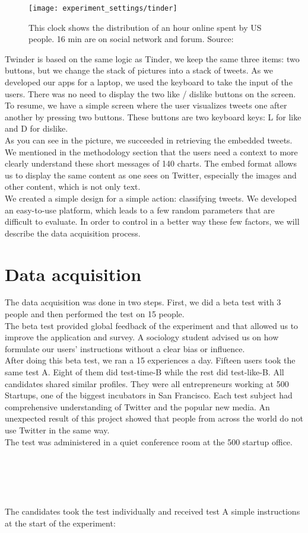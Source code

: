 \begin{figure}[h] 
\centering 
\texttt{[image: experiment\_settings/tinder]} 
\caption[Time spent of Social Media]{This clock shows the distribution of an hour online spent by US people. 16 min are on social network and forum. Source: \cite{s_clock}}
\label{fig:tinder} 
\end{figure}

Twinder is based on the same logic as Tinder, we keep the same three items: two buttons, but we change the stack of pictures into a stack of tweets. As we developed our apps for a laptop, we used the keyboard to take the input of the users. There was no need to display the two like / dislike buttons on the screen. To resume, we have a simple screen where the user visualizes tweets one after another by pressing two buttons. These buttons are two keyboard keys: L for like and D for dislike.\\
As you can see in the picture, we succeeded in retrieving the embedded tweets. We mentioned in the methodology section that the users need a context to more clearly understand these short messages of 140 charts. The embed format allows us to display the same content as one sees on Twitter, especially the images and other content, which is not only text.\\
We created a simple design for a simple action: classifying tweets. We developed an easy-to-use platform, which leads to a few random parameters that are difficult to evaluate. In order to control in a better way these few factors, we will describe the data acquisition process.

\section{Data acquisition}

The data acquisition was done in two steps. First, we did a beta test with 3 people and then performed the test on 15 people. \\
The beta test provided global feedback of the experiment and that allowed us to improve the application and survey. A sociology student advised us on how formulate our users' instructions without a clear bias or influence. \\
After doing this beta test, we ran a 15 experiences a day. Fifteen users took the same test A. Eight of them did test-time-B while the rest did test-like-B. All candidates shared similar profiles. They were all entrepreneurs working at 500 Startups, one of the biggest incubators in San Francisco. Each test subject had comprehensive understanding of Twitter and the popular new media. An unexpected result of this project showed that people from across the world do not use Twitter in the same way.\\
The test was administered in a quiet conference room at the 500 startup office. \\ \\ \\ \\ \\ \\
The candidates took the test individually and received test A simple instructions at the start of the experiment:

